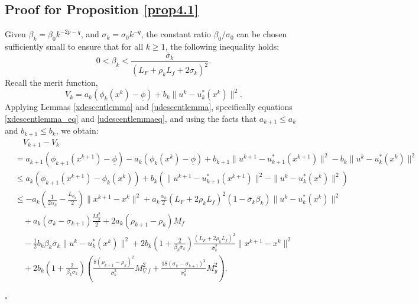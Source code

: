 \documentclass{article}
\newenvironment{proof}[1][Proof]{\par
	\normalfont\topsep6pt\relax
	\trivlist\item[\hskip\labelsep\itshape #1.]\ignorespaces
}{%
	\hfill\ensuremath{\square}\endtrivlist
}
\begin{document}
\subsection{Proof for Proposition \ref{prop4.1}}
      \begin{proof}[Proof of Proposition \ref{prop4.1}
      ]
      
      Given $\beta_k = \beta_0 k^{-2p-q}$, and $\sigma_k = \sigma_0 k^{-q}$, the constant ratio $\beta_0/\sigma_0$ can be chosen sufficiently small to ensure that for all $k \ge 1$, the following inequality holds:
      \[
      0 < \beta_k<\frac{\bar{\sigma}_k}{(L_F + \rho_k L_f + 2\sigma_k)^2}.
      \]      
      Recall the merit function,
      \[
      V_k = a_k(\phi_k(x^k) - \underline{\phi}) + b_k\| u^{k}- u_{k}^*(x^k)\|^2.
      \]
      Applying Lemmas \ref{xdescentlemma} and \ref{udescentlemma}, specifically equations \eqref{xdescentlemma_eq} and \eqref{udescentlemmaeq},
      and using the facts that $a_{k+1} \le a_k$ and $b_{k+1} \le b_k$, we obtain:
      \begin{equation}\label{lem_b8_eq1}
      \begin{aligned}
         &\quad V_{k+1} - V_k \\
         &= a_{k+1}(\phi_{k+1}(x^{k+1}) - \underline{\phi}) - a_k(\phi_k(x^k) - \underline{\phi}) + b_{k+1}\| u^{k+1}- u_{k+1}^*(x^{k+1})\|^2 -  b_k\| u^{k}- u_{k}^*(x^k)\|^2 \\
         &\le a_{k}(\phi_{k+1}(x^{k+1})-\phi_k(x^k)) + b_{k} (\| u^{k+1}- u_{k+1}^*(x^{k+1})\|^2 - \| u^{k}- u_{k}^*(x^k)\|^2) \\
         & \le - a_{k}\left( \frac{1}{2\alpha_k} - \frac{L_{\phi_k}}{2}\right) \|x^{k+1}-x^{k}\|^2 + a_{k}\frac{\alpha_k}{2} (L_F + 2\rho_k L_f)^2 (1-\bar{\sigma}_k \beta_k) \| u^{k}- u_{k}^*(x^k)\|^2 \\
         & \quad + a_{k}\left( \sigma_k - \sigma_{k+1} \right)\frac{M_y^2 }{2} + 2a_{k}\left(\rho_{k+1}-\rho_{k}\right)M_f \\
         &\quad -\frac{1}{2} b_k \beta_k\bar{\sigma}_k \|u^{k}-u_{k}^*(x^{k})\|^2 + 2b_k(1+\frac{2}{\beta_k\bar{\sigma}_k})\frac{(L_{F}+2\rho_kL_{f})^2}{\bar{\sigma}_k^2}\|x^{k+1}-x^k\|^2 \\
        & \quad+2b_{k}(1+\frac{2}{\beta_k\bar{\sigma}_k}) \left( \frac{8(\rho_{k+1} - \rho_k)^2}{\bar{\sigma}_k^2}M_{\nabla f}^2 + \frac{18(\sigma_{k} - \sigma_{k+1})^2}{\bar{\sigma}_k^2}M_y^2 \right).
      \end{aligned}
      \end{equation}
        

\end{proof}
\end{document}
